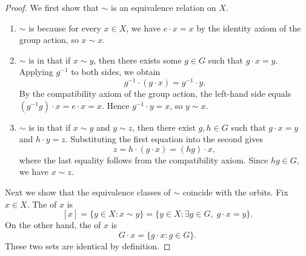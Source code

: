 \begin{proof}
    We first show that $\sim$ is an equivalence relation on $X$.

    \begin{enumerate}
        \item $\sim$ is  because for every $x \in X$, we have $e \cdot x = x$ by the identity axiom of the group action, so $x \sim x$.

        \item $\sim$ is  in that if $x \sim y$, then there exists some $g \in G$ such that $g \cdot x = y$. Applying $g^{-1}$ to both sides, we obtain
        $$g^{-1} \cdot (g \cdot x) = g^{-1} \cdot y.$$
        By the compatibility axiom of the group action, the left-hand side equals $(g^{-1}g) \cdot x = e \cdot x = x$. Hence $g^{-1} \cdot y = x$, so $y \sim x$.

        \item $\sim$ is  in that if $x \sim y$ and $y \sim z$, then there exist $g, h \in G$ such that $g \cdot x = y$ and $h \cdot y = z$. Substituting the first equation into the second gives
        $$z = h \cdot (g \cdot x) = (hg) \cdot x,$$
        where the last equality follows from the compatibility axiom. Since $hg \in G$, we have $x \sim z$.
    \end{enumerate}

    Next we show that the equivalence classes of $\sim$ coincide with the orbits. Fix $x \in X$. The  of $x$ is
    $$[x] = \{ y \in X : x \sim y \} = \{ y \in X : \exists g \in G, \; g \cdot x = y \}.$$
    On the other hand, the  of $x$ is
    $$G \cdot x = \{ g \cdot x : g \in G \}.$$
    These two sets are identical by definition.
\end{proof}

